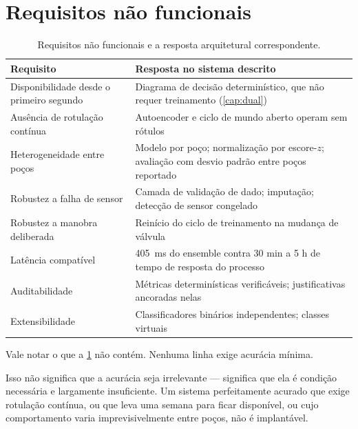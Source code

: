 \section{Requisitos não funcionais}

\begin{table}[htbp]
\centering
\caption{Requisitos não funcionais e a resposta arquitetural correspondente.}
\label{tab:oper-requisitos}
\small
\begin{tabular}{p{3.6cm}p{8.4cm}}
\toprule
\textbf{Requisito} & \textbf{Resposta no sistema descrito} \\
\midrule
Disponibilidade desde o primeiro segundo &
Diagrama de decisão determinístico, que não requer treinamento
(\cref{cap:dual}) \\
\addlinespace
Ausência de rotulação contínua &
Autoencoder e ciclo de mundo aberto operam sem rótulos \\
\addlinespace
Heterogeneidade entre poços &
Modelo por poço; normalização por escore-$z$; avaliação com desvio padrão entre poços
reportado \\
\addlinespace
Robustez a falha de sensor &
Camada de validação de dado; imputação; detecção de sensor congelado \\
\addlinespace
Robustez a manobra deliberada &
Reinício do ciclo de treinamento na mudança de válvula \\
\addlinespace
Latência compatível &
\SI{405}{\milli\second} do ensemble contra 30 min a 5 h de tempo de resposta do processo \\
\addlinespace
Auditabilidade &
Métricas determinísticas verificáveis; justificativas ancoradas nelas \\
\addlinespace
Extensibilidade &
Classificadores binários independentes; classes virtuais \\
\bottomrule
\end{tabular}
\end{table}

\begin{destaque}
Vale notar o que a \cref{tab:oper-requisitos} não contém. Nenhuma linha exige acurácia
mínima.

Isso não significa que a acurácia seja irrelevante --- significa que ela é condição
necessária e largamente insuficiente. Um sistema perfeitamente acurado que exige
rotulação contínua, ou que leva uma semana para ficar disponível, ou cujo comportamento
varia imprevisivelmente entre poços, não é implantável.
\end{destaque}

